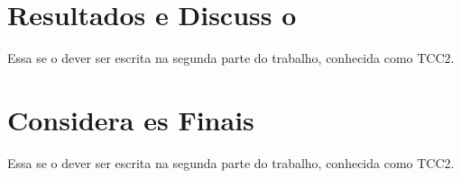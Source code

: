 \documentclass{article}
\begin{document}
\section{Resultados e Discuss o}
Essa se o dever  ser escrita na segunda parte do trabalho, conhecida como TCC2.

\section{Considera es Finais}
Essa se o dever  ser escrita na segunda parte do trabalho, conhecida como TCC2.

\printbibliography  %
\end{document}
